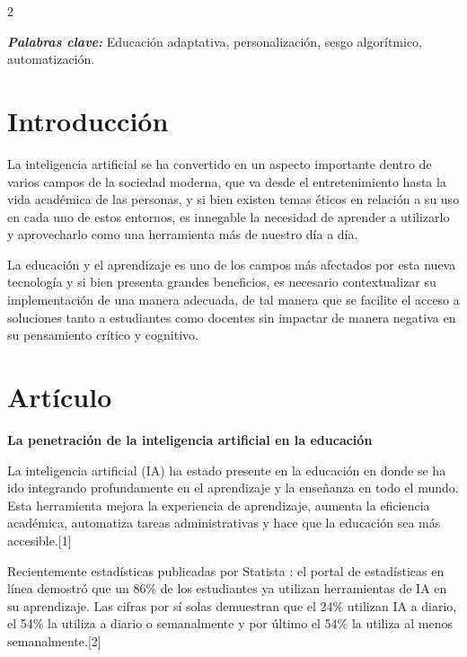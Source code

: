\documentclass[12pt,spanish,Letterpaper,openany]{book}
\begin{document}
\begin {multicols}{2}

\textbf{\emph{Palabras clave:}} Educación adaptativa, personalización, sesgo algorítmico, automatización.

\section{Introducción}\label{introducciuxf3n}

La inteligencia artificial se ha convertido en un aspecto importante dentro de varios campos de la sociedad moderna, que va desde el entretenimiento hasta la vida académica de las personas, y si bien existen temas éticos en relación a su uso en cada uno de estos entornos, es innegable la necesidad de aprender a utilizarlo y aprovecharlo como una herramienta más de nuestro día a día.

La educación y el aprendizaje es uno de los campos más afectados por esta nueva tecnología y si bien presenta grandes beneficios, es necesario contextualizar su implementación de una manera adecuada, de tal manera que se facilite el acceso a soluciones tanto a estudiantes como docentes sin impactar de manera negativa en su pensamiento crítico y cognitivo.

\section{Artículo}\label{artuxedculo}

\bigskip

\textbf{La penetración de la inteligencia artificial en la educación}

La inteligencia artificial (IA) ha estado presente en la educación en donde se ha ido
integrando profundamente en el aprendizaje y la enseñanza en todo el mundo. Esta herramienta mejora la experiencia de aprendizaje, aumenta la eficiencia académica, automatiza tareas administrativas y hace que la educación sea más accesible.{[}1{]}

Recientemente estadísticas publicadas por Statista : el portal de estadísticas en línea demostró que un 86\% de los estudiantes ya utilizan herramientas de IA en su aprendizaje. Las cifras por sí solas demuestran que el 24\% utilizan IA a diario, el 54\% la utiliza a diario o semanalmente y por último el 54\% la utiliza al menos semanalmente.{[}2{]}

\begin {flushleft}
\noindent\begin{minipage}[c]{\columnwidth}


\end{minipage}
\end{flushleft}
\end{multicols}
\end{document}
